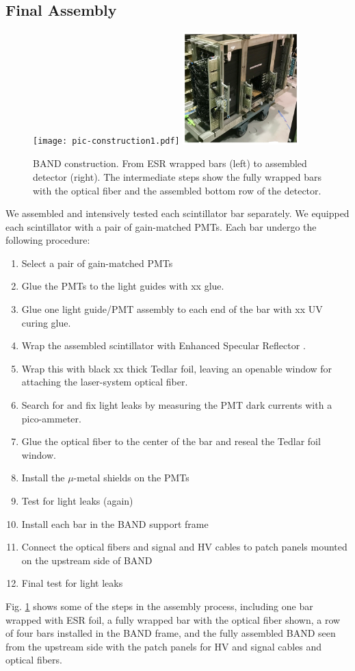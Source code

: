 \documentclass[3p,final,twocolumn]{elsarticle}
\begin{document}
\subsection{Final Assembly}
\begin{figure}[tb]
	\centering
	\texttt{[image: pic-construction1.pdf]}
	\includegraphics[width=0.40\textwidth , height=0.40\textwidth]{pic-construction2.pdf}
				\caption{BAND construction. From ESR \cite{3MESR} wrapped bars (left) to assembled detector (right). The intermediate steps show the fully wrapped bars with the optical fiber and the assembled bottom row of the detector.}
		\label{fig:barassembly}
\end{figure}
We assembled and intensively tested each scintillator bar
separately. We equipped each scintillator with a pair of gain-matched
PMTs.  Each bar undergo the following procedure:
\begin{enumerate}
\item Select a pair of gain-matched PMTs
\item Glue the PMTs to the light guides with xx glue.
\item Glue one light guide/PMT assembly to each end of the bar with xx
  UV curing glue.
\item Wrap the assembled scintillator with Enhanced Specular Reflector \cite{3MESR}.
\item Wrap this with black xx thick Tedlar foil, leaving an openable
  window for attaching the laser-system optical fiber.
\item Search for and fix light leaks by measuring the PMT dark currents with a pico-ammeter.
\item Glue the optical fiber to the center of the bar and reseal the Tedlar foil window.
\item Install the $\mu$-metal shields on the PMTs 
\item Test for light leaks (again)
\item Install each bar in the BAND support frame
\item Connect the optical fibers and signal and HV cables to patch panels mounted on the upstream side of BAND
\item Final test for light leaks
\end{enumerate}
Fig. \ref{fig:barassembly} shows some of the steps in the assembly process,
including one bar wrapped with ESR foil, a fully wrapped bar with the
optical fiber shown, a row of four bars installed in the BAND frame,
and the fully assembled BAND seen from the upstream side with the
patch panels for HV and  signal cables and optical fibers.
\end{document}
